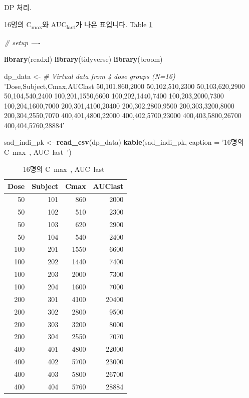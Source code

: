 \documentclass[12pt,]{krantz}
\newenvironment{Shaded}{\begin{snugshade}}{\end{snugshade}}
\newcommand{\KeywordTok}[1]{\textcolor[rgb]{0.13,0.29,0.53}{\textbf{#1}}}
\newcommand{\DataTypeTok}[1]{\textcolor[rgb]{0.13,0.29,0.53}{#1}}
\newcommand{\StringTok}[1]{\textcolor[rgb]{0.31,0.60,0.02}{#1}}
\newcommand{\CommentTok}[1]{\textcolor[rgb]{0.56,0.35,0.01}{\textit{#1}}}
\newcommand{\NormalTok}[1]{#1}
\theoremstyle{definition}
\theoremstyle{definition}
\theoremstyle{definition}
\theoremstyle{remark}
\begin{document}
DP 처리.

16명의 C\textsubscript{max}와 AUC\textsubscript{last}가 나온 표입니다.
Table \ref{tab:sad-pk}

\begin{Shaded}
\begin{Highlighting}[]
\CommentTok{# setup ----}

\KeywordTok{library}\NormalTok{(readxl)}
\KeywordTok{library}\NormalTok{(tidyverse)}
\KeywordTok{library}\NormalTok{(broom)}

\NormalTok{dp_data <-}\StringTok{ }\CommentTok{# Virtual data from 4 dose groups (N=16)}
\StringTok{'Dose,Subject,Cmax,AUClast}
\StringTok{50,101,860,2000}
\StringTok{50,102,510,2300}
\StringTok{50,103,620,2900}
\StringTok{50,104,540,2400}
\StringTok{100,201,1550,6600}
\StringTok{100,202,1440,7400}
\StringTok{100,203,2000,7300}
\StringTok{100,204,1600,7000}
\StringTok{200,301,4100,20400}
\StringTok{200,302,2800,9500}
\StringTok{200,303,3200,8000}
\StringTok{200,304,2550,7070}
\StringTok{400,401,4800,22000}
\StringTok{400,402,5700,23000}
\StringTok{400,403,5800,26700}
\StringTok{400,404,5760,28884'}

\NormalTok{sad_indi_pk <-}\StringTok{ }\KeywordTok{read_csv}\NormalTok{(dp_data)}
\KeywordTok{kable}\NormalTok{(sad_indi_pk, }\DataTypeTok{caption =} \StringTok{'16명의 C~max~, AUC~last~'}\NormalTok{)}
\end{Highlighting}
\end{Shaded}

\begin{table}

\caption{\label{tab:sad-pk}16명의 C~max~, AUC~last~}
\centering
\begin{tabular}[t]{r|r|r|r}
\hline
Dose & Subject & Cmax & AUClast\\
\hline
50 & 101 & 860 & 2000\\
\hline
50 & 102 & 510 & 2300\\
\hline
50 & 103 & 620 & 2900\\
\hline
50 & 104 & 540 & 2400\\
\hline
100 & 201 & 1550 & 6600\\
\hline
100 & 202 & 1440 & 7400\\
\hline
100 & 203 & 2000 & 7300\\
\hline
100 & 204 & 1600 & 7000\\
\hline
200 & 301 & 4100 & 20400\\
\hline
200 & 302 & 2800 & 9500\\
\hline
200 & 303 & 3200 & 8000\\
\hline
200 & 304 & 2550 & 7070\\
\hline
400 & 401 & 4800 & 22000\\
\hline
400 & 402 & 5700 & 23000\\
\hline
400 & 403 & 5800 & 26700\\
\hline
400 & 404 & 5760 & 28884\\
\hline
\end{tabular}
\end{table}
\end{document}
